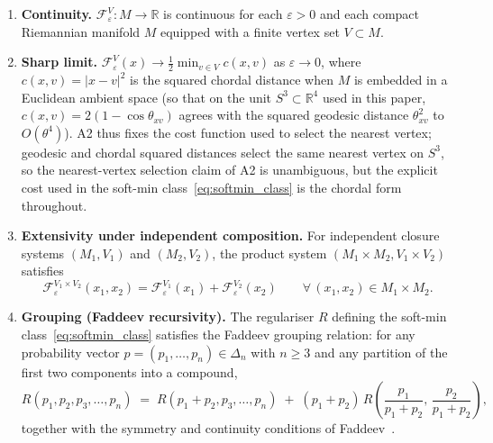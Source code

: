 \documentclass[12pt]{article}
\newcommand{\Fcal}{\mathcal{F}}
\begin{document}
\begin{enumerate}
    \item[\textbf{A1.}] \textbf{Continuity.} $\Fcal_\varepsilon^V : M \to \mathbb{R}$ is continuous for each $\varepsilon > 0$ and each compact Riemannian manifold $M$ equipped with a finite vertex set $V \subset M$.
    \item[\textbf{A2.}] \textbf{Sharp limit.} $\Fcal_\varepsilon^V(x) \to \tfrac{1}{2}\min_{v \in V} c(x, v)$ as $\varepsilon \to 0$, where $c(x, v) = |x - v|^2$ is the squared chordal distance when $M$ is embedded in a Euclidean ambient space (so that on the unit $S^3 \subset \mathbb{R}^4$ used in this paper, $c(x, v) = 2(1 - \cos\theta_{xv})$ agrees with the squared geodesic distance $\theta_{xv}^2$ to $O(\theta^4)$). A2 thus fixes the cost function used to select the nearest vertex; geodesic and chordal squared distances select the same nearest vertex on $S^3$, so the nearest-vertex selection claim of A2 is unambiguous, but the explicit cost used in the soft-min class~\eqref{eq:softmin_class} is the chordal form throughout.
    \item[\textbf{A3.}] \textbf{Extensivity under independent composition.} For independent closure systems $(M_1, V_1)$ and $(M_2, V_2)$, the product system $(M_1 \times M_2, V_1 \times V_2)$ satisfies
    \begin{equation}\label{eq:A3}
        \Fcal_\varepsilon^{V_1 \times V_2}(x_1, x_2) = \Fcal_\varepsilon^{V_1}(x_1) + \Fcal_\varepsilon^{V_2}(x_2)
        \qquad \forall\,(x_1, x_2) \in M_1 \times M_2.
    \end{equation}
    \item[\textbf{A4.}] \textbf{Grouping (Faddeev recursivity).} The regulariser $R$ defining the soft-min class~\eqref{eq:softmin_class} satisfies the Faddeev grouping relation: for any probability vector $p = (p_1, \ldots, p_n) \in \Delta_n$ with $n \geq 3$ and any partition of the first two components into a compound,
    \begin{equation}\label{eq:A4}
        R(p_1, p_2, p_3, \ldots, p_n) \;=\; R(p_1 + p_2, p_3, \ldots, p_n) \;+\; (p_1 + p_2)\,R\!\left(\frac{p_1}{p_1 + p_2},\,\frac{p_2}{p_1 + p_2}\right),
    \end{equation}
    together with the symmetry and continuity conditions of Faddeev~\citep{Faddeev1956}.
\end{enumerate}
\end{document}
